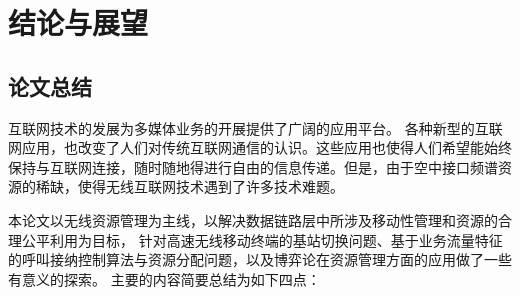 \chapter{结论与展望}
\label{chap_conclusions}
\section{论文总结}
互联网技术的发展为多媒体业务的开展提供了广阔的应用平台。
各种新型的互联网应用，也改变了人们对传统互联网通信的认识。这些应用也使得人们希望能始终保持与互联网连接，随时随地得进行自由的信息传递。但是，由于空中接口频谱资源的稀缺，使得无线互联网技术遇到了许多技术难题。

本论文以无线资源管理为主线，以解决数据链路层中所涉及移动性管理和资源的合理公平利用为目标，
针对高速无线移动终端的基站切换问题、基于业务流量特征的呼叫接纳控制算法与资源分配问题，以及博弈论在资源管理方面的应用做了一些有意义的探索。
主要的内容简要总结为如下四点：

